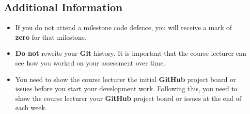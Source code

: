 \documentclass{article}
\begin{document}
\subsection*{Additional Information}
\begin{itemize}
    \item If you do not attend a milestone code defence, you will receive a mark of \textbf{zero} for that milestone.
	\item \textbf{Do not} rewrite your \textbf{Git} history. It is important that the course lecturer can see how you worked on your assessment over time. 
    \item You need to show the course lecturer the initial \textbf{GitHub} project board or issues before you start your development work. Following this, you need to show the course lecturer your \textbf{GitHub} project board or issues at the end of each week.
\end{itemize} 
\end{document}
